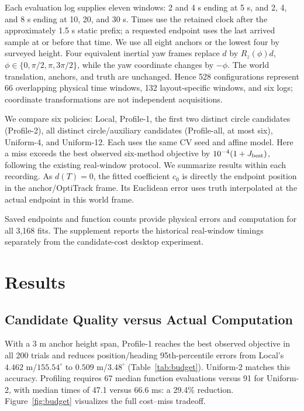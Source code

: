 \documentclass[conference,letterpaper,10pt]{IEEEtran}
\newcommand{\rz}{R_z}
\begin{document}
Each evaluation log supplies eleven windows: 2 and 4 s ending at 5 s, and 2, 4, and 8 s ending at 10, 20, and 30 s. Times use the retained clock after the approximately 1.5 s static prefix; a requested endpoint uses the last arrived sample at or before that time. We use all eight anchors or the lowest four by surveyed height. Four equivalent inertial yaw frames replace $d$ by $\rz(\phi)d$, $\phi\in\{0,\pi/2,\pi,3\pi/2\}$, while the yaw coordinate changes by $-\phi$. The world translation, anchors, and truth are unchanged. Hence 528 configurations represent 66 overlapping physical time windows, 132 layout-specific windows, and six logs; coordinate transformations are not independent acquisitions.

We compare six policies: Local, Profile-1, the first two distinct circle candidates (Profile-2), all distinct circle/auxiliary candidates (Profile-all, at most six), Uniform-4, and Uniform-12. Each uses the same CV seed and affine model. Here a miss exceeds the best observed six-method objective by $10^{-4}(1+J_{\rm best})$, following the existing real-window protocol. We summarize results within each recording. As $d(T)=0$, the fitted coefficient $c_0$ is directly the endpoint position in the anchor/OptiTrack frame. Its Euclidean error uses truth interpolated at the actual endpoint in this world frame.

Saved endpoints and function counts provide physical errors and computation for all 3,168 fits. The supplement reports the historical real-window timings separately from the candidate-cost desktop experiment.

\section{Results}
\subsection{Candidate Quality versus Actual Computation}
With a 3 m anchor height span, Profile-1 reaches the best observed objective in all 200 trials and reduces position/heading 95th-percentile errors from Local's $4.462$ m/$155.54^\circ$ to $0.509$ m/$3.48^\circ$ (Table~\ref{tab:budget}). Uniform-2 matches this accuracy. Profiling requires 67 median function evaluations versus 91 for Uniform-2, with median times of 47.1 versus 66.6 ms: a 29.4\% reduction. Figure~\ref{fig:budget} visualizes the full cost--miss tradeoff.

\begin{table}[t]
\caption{Matched candidate policies at 30 m stand-off: 200 paired seeds per geometry. Misses use the five-method best observed objective. Errors are 95th percentiles. Evaluations include both CV solves and all yaw refinements. Wall time is median/95th percentile from the separate 8-seed-per-geometry, 5-repeat sequential subset.}
\label{tab:budget}
\centering

\end{table}
\end{document}
